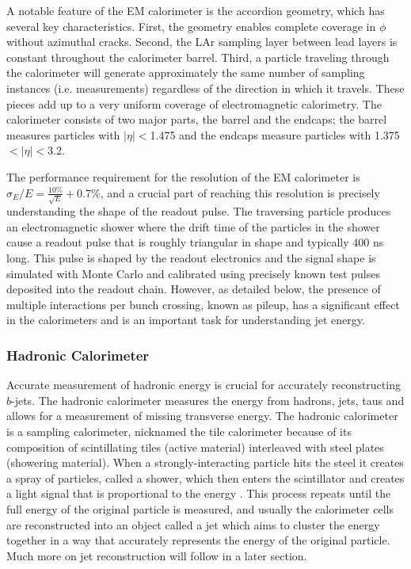 A notable feature of the EM calorimeter is the accordion geometry, which has several key characteristics.  First, 
the geometry enables complete coverage in $\phi$ without azimuthal cracks.  Second, the LAr sampling layer between 
lead layers is constant throughout the calorimeter barrel.  Third, a particle traveling through the calorimeter will generate approximately 
the same number of sampling instances (i.e. measurements) regardless of the direction in which it 
travels.  These pieces add up to a very uniform coverage of electromagnetic calorimetry.  The calorimeter consists of two 
major parts, the barrel and the endcaps; the barrel measures particles with $|\eta|<$1.475 
and the endcaps measure particles with 1.375$<|\eta|<$3.2.  

The performance requirement for the resolution of the EM calorimeter is 
$\sigma_E/E=\frac{10\%}{\sqrt{E}}+$0.7\%, and 
a crucial part of reaching this resolution is precisely understanding the shape of the readout pulse.  The traversing particle 
produces an electromagnetic shower where the drift time of the particles in the shower cause a readout pulse that is 
roughly triangular in shape and typically 400 ns long.  This pulse is shaped by the readout electronics and the 
signal shape is simulated with Monte Carlo and calibrated using precisely known test pulses deposited into the readout chain.  
However, as detailed below, the presence of multiple interactions per bunch crossing, known as pileup, has 
a significant effect in the calorimeters and is an important task for understanding jet energy.

\subsubsection{Hadronic Calorimeter} 
\label{sec:h_cal}
Accurate measurement of hadronic energy is crucial for accurately reconstructing $b$-jets.  The hadronic calorimeter measures the 
energy from hadrons, jets, taus and allows for a measurement of missing transverse energy.  The hadronic calorimeter 
is a sampling calorimeter, nicknamed the tile calorimeter because of its composition of scintillating tiles (active material) 
interleaved with steel plates (showering material).  When a strongly-interacting particle hits the steel it creates a 
spray of particles, called a shower, which then enters the scintillator and creates a light signal that is 
proportional to the energy .  This process repeats until the full energy of the original particle is measured, and 
usually the calorimeter cells are reconstructed into an object called a jet which aims to cluster the energy together in 
a way that accurately represents the energy of the original particle.  Much more on jet reconstruction will follow in a later section.

